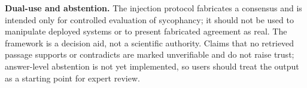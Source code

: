\documentclass[a4paper,fleqn]{cas-sc}
\begin{document}
\textbf{Dual-use and abstention.} The injection protocol fabricates a consensus and is intended only for controlled evaluation of sycophancy; it should not be used to manipulate deployed systems or to present fabricated agreement as real. The framework is a decision aid, not a scientific authority. Claims that no retrieved passage supports or contradicts are marked unverifiable and do not raise trust; answer-level abstention is not yet implemented, so users should treat the output as a starting point for expert review.
\printcredits

\newpage



\vspace{12pt}
\end{document}
